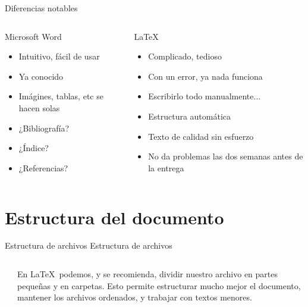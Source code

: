 \documentclass[12pt]{beamer}
\begin{document}
\begin{frame}[t]{Diferencias notables}
	\begin{columns}[t]
		\begin{column}{0.4\textwidth}
			Microsoft Word
			\begin{itemize}
				\item Intuitivo, fácil de usar
				\item Ya conocido
				\item Imágines, tablas, etc se hacen solas \\
				\hrulefill
				\item ¿Bibliografía?
				\item ¿Índice?
				\item ¿Referencias?
			\end{itemize}
		\end{column}
		\begin{column}{0.55\textwidth}
			\LaTeX
			\begin{itemize}
				\item Complicado, tedioso
				\item Con un error, ya nada funciona
				\item Escribirlo todo manualmente...\\
				\hrulefill
				\item Estructura automática
				\item Texto de calidad sin esfuerzo
				\item No da problemas las dos semanas antes de la entrega
			\end{itemize}
		\end{column}
	\end{columns}
\end{frame}

\section{Estructura del documento}

\begin{frame}{Estructura de archivos}
	Estructura de archivos
	\begin{columns}
		\begin{column}{0.4\textwidth}
		\end{column}
		\begin{column}{0.6\textwidth}
			En \LaTeX\ podemos, y se recomienda, dividir nuestro archivo en partes pequeñas y en carpetas. Esto permite estructurar mucho mejor el documento, mantener los archivos ordenados, y trabajar con textos menores.
		\end{column}
	\end{columns}
\end{frame}
\end{document}
